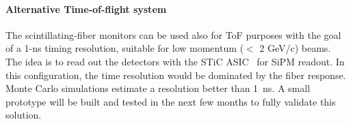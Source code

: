 \paragraph{Alternative Time-of-flight system}
The  scintillating-fiber monitors can be used also for ToF purposes with the goal of a 1-ns timing resolution, suitable for low momentum ($<$ 2 GeV/c) beams. 
The idea is to read out the detectors with the STiC ASIC~\cite{STIC} for SiPM readout. 
In this configuration, the time resolution would be dominated by the fiber response. Monte Carlo simulations estimate a resolution better than 1~ns. 
A small prototype will be built and tested in the next few months to fully validate this solution.

